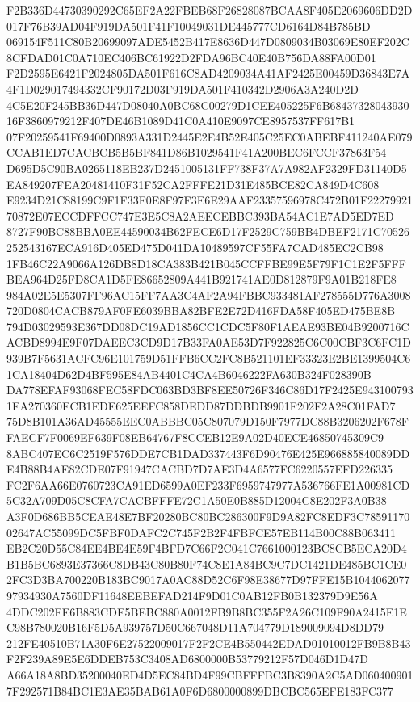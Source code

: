 \documentclass[UTF8,fontset=fandol,zihao=-4,a4paper]{ctexart}
\begin{document}
{{F2B336D44730390292C65EF2A22FBEB68F26828087BCAA8F405E2069606DD2D017F76B39AD04F919DA501F41F10049031DE445777CD6164D84B785BD
069154F511C80B20699097ADE5452B417E8636D447D0809034B03069E80EF202C8CFDAD01C0A710EC406BC61922D2FDA96BC40E40B756DA88FA00D01
F2D2595E6421F2024805DA501F616C8AD4209034A41AF2425E00459D36843E7A4F1D029017494332CF90172D03F919DA501F410342D2906A3A240D2D
4C5E20F245BB36D447D08040A0BC68C00279D1CEE405225F6B6843732804393016F3860979212F407DE46B1089D41C0A410E9097CE8957537FF617B1
07F20259541F69400D0893A331D2445E2E4B52E405C25EC0ABEBF411240AE079CCAB1ED7CACBCB5B5BF841D86B1029541F41A200BEC6FCCF37863F54
D695D5C90BA0265118EB237D2451005131FF738F37A7A982AF2329FD31140D5EA849207FEA20481410F31F52CA2FFFE21D31E485BCE82CA849D4C608
E9234D21C88199C9F1F33F0E8F97F3E6E29AAF23357596978C472B01F2227992170872E07ECCDFFCC747E3E5C8A2AEECEBBC393BA54AC1E7AD5ED7ED
8727F90BC88BBA0EE44590034B62FECE6D17F2529C759BB4DBEF2171C70526252543167ECA916D405ED475D041DA10489597CF55FA7CAD485EC2CB98
1FB46C22A9066A126DB8D18CA383B421B045CCFFBE99E5F79F1C1E2F5FFFBEA964D25FD8CA1D5FE86652809A441B921741AE0D812879F9A01B218FE8
984A02E5E5307FF96AC15FF7AA3C4AF2A94FBBC933481AF278555D776A3008720D0804CACB879AF0FE6039BBA82BFE2E72D416FDA58F405ED475BE8B
794D03029593E367DD08DC19AD1856CC1CDC5F80F1AEAE93BE04B9200716CACBD8994E9F07DAEEC3CD9D17B33FA0AE53D7F922825C6C00CBF3C6FC1D
939B7F5631ACFC96E101759D51FFB6CC2FC8B521101EF33323E2BE1399504C61CA18404D62D4BF595E84AB4401C4CA4B6046222FA630B324F028390B
DA778EFAF93068FEC58FDC063BD3BF8EE50726F346C86D17F2425E9431007931EA270360ECB1EDE625EEFC858DEDD87DDBDB9901F202F2A28C01FAD7
75D8B101A36AD45555EEC0ABBBC05C807079D150F7977DC88B3206202F678FFAECF7F0069EF639F08EB64767F8CCEB12E9A02D40ECE46850745309C9
8ABC407EC6C2519F576DDE7CB1DAD337443F6D90476E425E966885840089DDE4B88B4AE82CDE07F91947CACBD7D7AE3D4A6577FC6220557EFD226335
FC2F6AA66E0760723CA91ED6599A0EF233F6959747977A536766FE1A00981CD5C32A709D05C8CFA7CACBFFFE72C1A50E0B885D12004C8E202F3A0B38
A3F0D686BB5CEAE48E7BF20280BC80BC286300F9D9A82FC8EDF3C7859117002647AC55099DC5FBF0DAFC2C745F2B2F4FBFCE57EB114B00C88B063411
EB2C20D55C84EE4BE4E59F4BFD7C66F2C041C7661000123BC8CB5ECA20D4B1B5BC6893E37366C8DB43C80B80F74C8E1A84BC9C7DC1421DE485BC1CE0
2FC3D3BA700220B183BC9017A0AC88D52C6F98E38677D97FFE15B104406207797934930A7560DF11648EEBEFAD214F9D01C0AB12FB0B132379D9E56A
4DDC202FE6B883CDE5BEBC880A0012FB9B8BC355F2A26C109F90A2415E1EC98B780020B16F5D5A939757D50C667048D11A704779D189009094D8DD79
212FE40510B71A30F6E27522009017F2F2CE4B550442EDAD01010012FB9B8B43F2F239A89E5E6DDEB753C3408AD6800000B53779212F57D046D1D47D
A66A18A8BD35200040ED4D5EC84BD4F99CBFFFBC3B8390A2C5AD0604009017F292571B84BC1E3AE35BAB61A0F6D6800000899DBCBC565EFE183FC377
}}
\end{document}
